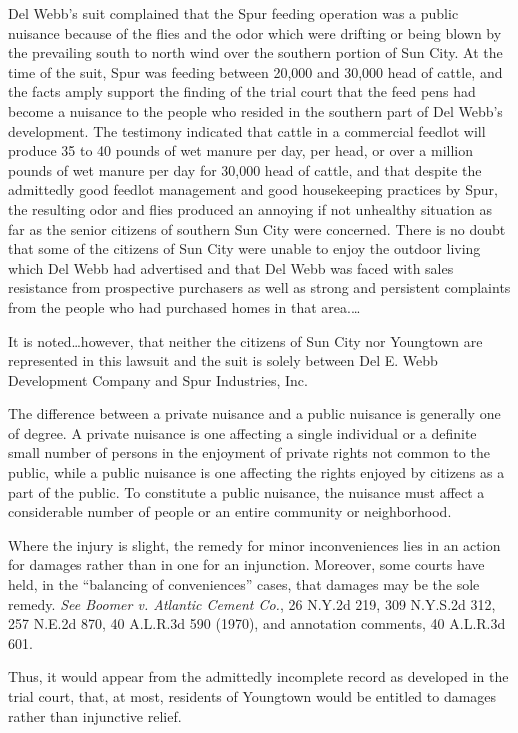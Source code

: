 Del Webb's suit complained that the Spur feeding operation was a public nuisance
because of the flies and the odor which were drifting or being blown by the
prevailing south to north wind over the southern portion of Sun City. At the
time of the suit, Spur was feeding between 20,000 and 30,000 head of cattle, and
the facts amply support the finding of the trial court that the feed pens had
become a nuisance to the people who resided in the southern part of Del Webb's
development. The testimony indicated that cattle in a commercial feedlot will
produce 35 to 40 pounds of wet manure per day, per head, or over a million
pounds of wet manure per day for 30,000 head of cattle, and that despite the
admittedly good feedlot management and good housekeeping practices by Spur, the
resulting odor and flies produced an annoying if not unhealthy situation as far
as the senior citizens of southern Sun City were concerned. There is no doubt
that some of the citizens of Sun City were unable to enjoy the outdoor living
which Del Webb had advertised and that Del Webb was faced with sales resistance
from prospective purchasers as well as strong and persistent complaints from the
people who had purchased homes in that area.\ldots

It is noted\ldots however, that neither the citizens of Sun City nor Youngtown
are represented in this lawsuit and the suit is solely between Del E. Webb
Development Company and Spur Industries, Inc.


The difference between a private nuisance and a public nuisance is generally one
of degree. A private nuisance is one affecting a single individual or a definite
small number of persons in the enjoyment of private rights not common to the
public, while a public nuisance is one affecting the rights enjoyed by citizens
as a part of the public. To constitute a public nuisance, the nuisance must
affect a considerable number of people or an entire community or neighborhood. 

Where the injury is slight, the remedy for minor inconveniences lies in an
action for damages rather than in one for an injunction. Moreover, some courts
have held, in the ``balancing of conveniences'' cases, that damages may be the
sole remedy. \emph{See Boomer v. Atlantic Cement Co.}, 26 N.Y.2d 219, 309
N.Y.S.2d 312, 257 N.E.2d 870, 40 A.L.R.3d 590 (1970), and annotation comments,
40 A.L.R.3d 601.

Thus, it would appear from the admittedly incomplete record as developed in the
trial court, that, at most, residents of Youngtown would be entitled to damages
rather than injunctive relief.


